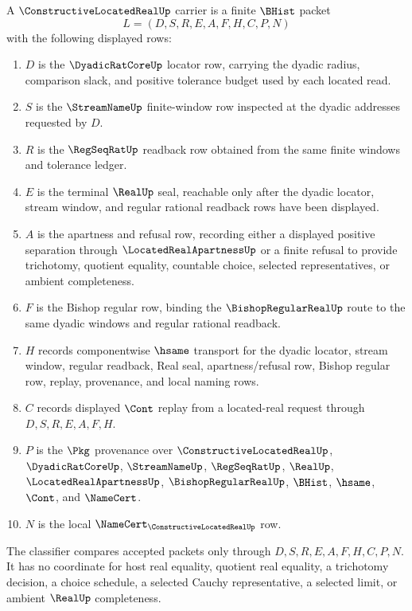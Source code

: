 \begin{definition}
\label{def:constructive-located-real-carrier}
A $\ConstructiveLocatedRealUp$ carrier is a finite $\BHist$ packet
$$
L=(D,S,R,E,A,F,H,C,P,N)
$$
with the following displayed rows:
\begin{enumerate}
\item $D$ is the $\DyadicRatCoreUp$ locator row, carrying the dyadic radius, comparison slack, and positive tolerance budget used by each located read.
\item $S$ is the $\StreamNameUp$ finite-window row inspected at the dyadic addresses requested by $D$.
\item $R$ is the $\RegSeqRatUp$ readback row obtained from the same finite windows and tolerance ledger.
\item $E$ is the terminal $\RealUp$ seal, reachable only after the dyadic locator, stream window, and regular rational readback rows have been displayed.
\item $A$ is the apartness and refusal row, recording either a displayed positive separation through $\LocatedRealApartnessUp$ or a finite refusal to provide trichotomy, quotient equality, countable choice, selected representatives, or ambient completeness.
\item $F$ is the Bishop regular row, binding the $\BishopRegularRealUp$ route to the same dyadic windows and regular rational readback.
\item $H$ records componentwise $\hsame$ transport for the dyadic locator, stream window, regular readback, Real seal, apartness/refusal row, Bishop regular row, replay, provenance, and local naming rows.
\item $C$ records displayed $\Cont$ replay from a located-real request through $D,S,R,E,A,F,H$.
\item $P$ is the $\Pkg$ provenance over $\ConstructiveLocatedRealUp$, $\DyadicRatCoreUp$, $\StreamNameUp$, $\RegSeqRatUp$, $\RealUp$, $\LocatedRealApartnessUp$, $\BishopRegularRealUp$, $\BHist$, $\hsame$, $\Cont$, and $\NameCert$.
\item $N$ is the local $\NameCert_{\ConstructiveLocatedRealUp}$ row.
\end{enumerate}
The classifier compares accepted packets only through $D,S,R,E,A,F,H,C,P,N$. It has no coordinate for host real equality, quotient real equality, a trichotomy decision, a choice schedule, a selected Cauchy representative, a selected limit, or ambient $\RealUp$ completeness.
\end{definition}

